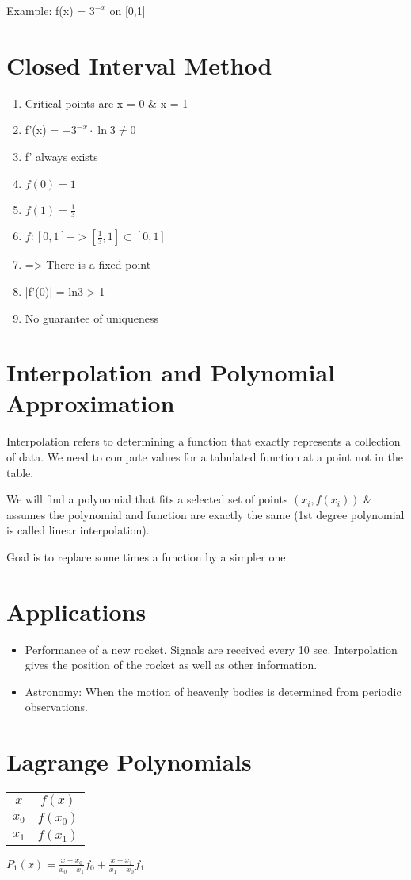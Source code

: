 \documentclass[]{article}
\title{}
\author{}
\begin{document}
\maketitle


Example: f(x) = $ 3^{-x} $ on [0,1]

\section*{Closed Interval Method}

\begin{enumerate}
	\item Critical points are x = 0 \& x = 1
	\item f'(x) = $ -3^{-x} \cdot \ln 3 \ne 0 $
	\item f' always exists
	\item $ f(0) = 1 $
	\item $ f(1) = \frac{1}{3} $
	\item $ f : [0,1] -> [\frac{1}{3}, 1] \subset [0,1] $
	\item => There is a fixed point
	\item |f'(0)| = ln3 > 1
	\item No guarantee of uniqueness
\end{enumerate}

\section*{Interpolation and Polynomial Approximation}

Interpolation refers to determining a function that exactly represents a collection of data. We need to compute values for a tabulated function at a point not in the table.

We will find a polynomial that fits a selected set of points $ (x_{i}, f(x_i)) $ \& assumes the polynomial and function are exactly the same (1st degree polynomial is called linear interpolation).

Goal is to replace some times a function by a simpler one.

\section*{Applications}

\begin{itemize}
	\item Performance of a new rocket.
	Signals are received every 10 sec. Interpolation gives the position of the rocket as well as other information. 
	\item Astronomy:
	When the motion of heavenly bodies is determined from periodic observations.
\end{itemize}

\section*{Lagrange Polynomials}

\begin{tabular}{c | c}
	 $ 	x  $ & $  f(x)   $ \\
$ 	x_0 $  &  $ f(x_0) $  \\
$ 	x_1 $  &  $ f(x_1)  $
\end{tabular}

$ P_1(x) = \frac{x-x_0}{x_0 - x_1}f_0 + \frac{x - x_1}{x_1 - x_0}f_1 $
\end{document}

